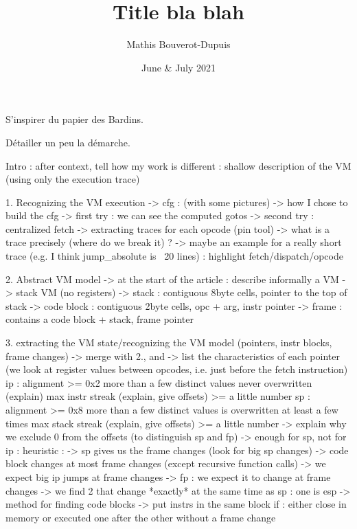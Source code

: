 \documentclass[french]{article}
\title{Title bla blah}
\author{Mathis Bouverot-Dupuis}
\date{June \& July 2021}
\begin{document}
\maketitle 

\begin{abstract}
	
\end{abstract}


\iffalse

S'inspirer du papier des Bardins.

Détailler un peu la démarche.

Intro : after context, tell how my work is different : shallow description of the VM (using only the execution trace)

1. Recognizing the VM execution
	-> cfg : (with some pictures)
		-> how I chose to build the cfg
		-> first try : we can see the computed gotos
		-> second try : centralized fetch
	-> extracting traces for each opcode (pin tool)
		-> what is a trace precisely (where do we break it) ?
		-> maybe an example for a really short trace (e.g. I think jump_absolute is ~20 lines) : highlight fetch/dispatch/opcode
		
2. Abstract VM model -> at the start of the article : describe informally a VM
	-> stack VM (no registers)
	-> stack : contiguous 8byte cells, pointer to the top of stack
	-> code block : contiguous 2byte cells, opc + arg, instr pointer
	-> frame : contains a code block + stack, frame pointer
	
3. extracting the VM state/recognizing the VM model (pointers, instr blocks, frame changes) -> merge with 2., and 
	-> list the characteristics of each pointer (we look at register values between opcodes, i.e. just before the fetch instruction)
		ip :
			alignment >= 0x2
			more than a few distinct values
			never overwritten (explain)
			max instr streak (explain, give offsets) >= a little number
		sp :
			alignment >= 0x8
			more than a few distinct values
			is overwritten at least a few times
			max stack streak (explain, give offsets) >= a little number
				-> explain why we exclude 0 from the offsets (to distinguish sp and fp)
	-> enough for sp, not for ip : 
		heuristic : 
			-> sp gives us the frame changes (look for big sp changes) 
			-> code block changes at most frame changes (except recursive function calls) 
			-> we expect big ip jumps at frame changes
	-> fp : we expect it to change at frame changes
		-> we find 2 that change *exactly* at the same time as sp : one is esp
	-> method for finding code blocks
		-> put instrs in the same block if :
			either close in memory
			or executed one after the other without a frame change
			
\end{document}
